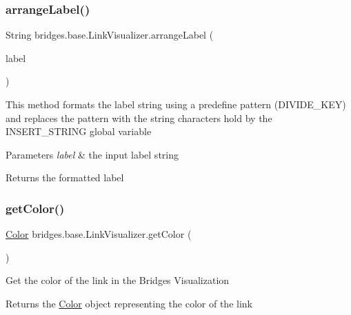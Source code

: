 \subsubsection{\texorpdfstring{arrange\+Label()}{arrangeLabel()}}
{\footnotesize\ttfamily String bridges.\+base.\+Link\+Visualizer.\+arrange\+Label (\begin{DoxyParamCaption}\item[{String}]{label }\end{DoxyParamCaption})}

This method formats the label string using a predefine pattern (D\+I\+V\+I\+D\+E\+\_\+\+K\+EY) and replaces the pattern with the string characters hold by the I\+N\+S\+E\+R\+T\+\_\+\+S\+T\+R\+I\+NG global variable


\begin{DoxyParams}{Parameters}
{\em label} & the input label string\\
\hline
\end{DoxyParams}
\begin{DoxyReturn}{Returns}
the formatted label 
\end{DoxyReturn}
\mbox{\label{classbridges_1_1base_1_1_link_visualizer_a3ed52d98ecab99c6d8dd136fba913b7d}} 
\subsubsection{\texorpdfstring{get\+Color()}{getColor()}}
{\footnotesize\ttfamily \mbox{\hyperlink{classbridges_1_1base_1_1_color}{Color}} bridges.\+base.\+Link\+Visualizer.\+get\+Color (\begin{DoxyParamCaption}{ }\end{DoxyParamCaption})}

Get the color of the link in the Bridges Visualization

\begin{DoxyReturn}{Returns}
the \mbox{\hyperlink{classbridges_1_1base_1_1_color}{Color}} object representing the color of the link 
\end{DoxyReturn}
\mbox{\label{classbridges_1_1base_1_1_link_visualizer_a9ed60a0f8a337cd2c98b2d6ab07b8601}} 
